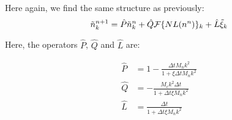 Here again, we find the same structure as previously:
%
\begin{equation}
    \tilde{n}_k^{n+1} = 
        \hat{P}\tilde{n}_k^n 
      + \hat{Q}\mathcal{F}\lbrace NL(n^n)\rbrace_k
      + \hat{L} \tilde{\xi}_k
\end{equation}

Here, the operators $\hat{P}$, $\hat{Q}$ and $\hat{L}$ are:

\begin{align}
    \hat{P} &= 1 - \frac{\Delta t M_n k^2}{1 + \xi\Delta t M_n k^2}  \\
    \hat{Q} &= -\frac{M_c k^2 \Delta t}{1 + \Delta t \xi M_n k^2} \\
    \hat{L} &= \frac{\Delta t}{1 + \Delta t \xi M_n k^2} 
\end{align}

